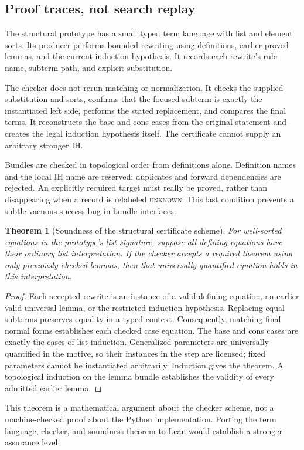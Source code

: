 \documentclass[11pt,letterpaper]{article}
\newcommand{\Unknown}{\textsc{unknown}}
\newtheorem{theorem}{Theorem}[section]
\theoremstyle{definition}\newtheorem{definition}[theorem]{Definition}
\theoremstyle{remark}\newtheorem{remark}[theorem]{Remark}
\begin{document}
\subsection{Proof traces, not search replay}
The structural prototype has a small typed term language with list and element sorts. Its producer performs bounded rewriting using definitions, earlier proved lemmas, and the current induction hypothesis. It records each rewrite's rule name, subterm path, and explicit substitution.

The checker does not rerun matching or normalization. It checks the supplied substitution and sorts, confirms that the focused subterm is exactly the instantiated left side, performs the stated replacement, and compares the final terms. It reconstructs the base and cons cases from the original statement and creates the legal induction hypothesis itself. The certificate cannot supply an arbitrary stronger IH.

Bundles are checked in topological order from definitions alone. Definition names and the local IH name are reserved; duplicates and forward dependencies are rejected. An explicitly required target must really be proved, rather than disappearing when a record is relabeled \Unknown. This last condition prevents a subtle vacuous-success bug in bundle interfaces.

\begin{theorem}[Soundness of the structural certificate scheme]
For well-sorted equations in the prototype's list signature, suppose all defining equations have their ordinary list interpretation. If the checker accepts a required theorem using only previously checked lemmas, then that universally quantified equation holds in this interpretation.
\end{theorem}
\begin{proof}
Each accepted rewrite is an instance of a valid defining equation, an earlier valid universal lemma, or the restricted induction hypothesis. Replacing equal subterms preserves equality in a typed context. Consequently, matching final normal forms establishes each checked case equation. The base and cons cases are exactly the cases of list induction. Generalized parameters are universally quantified in the motive, so their instances in the step are licensed; fixed parameters cannot be instantiated arbitrarily. Induction gives the theorem. A topological induction on the lemma bundle establishes the validity of every admitted earlier lemma.
\end{proof}
This theorem is a mathematical argument about the checker scheme, not a machine-checked proof about the Python implementation. Porting the term language, checker, and soundness theorem to Lean would establish a stronger assurance level.
\end{document}
